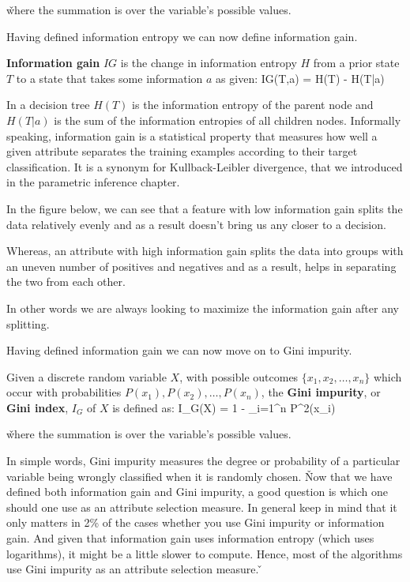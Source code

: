 \v

where the summation is over the variable's possible values.
\ed

Having defined information entropy we can now define information gain.

\textbf{Information gain} $IG$ is the change in information entropy $H$ from a prior state $T$ to a state that takes
some information $a$ as given:
\bse
IG(T,a) = H(T) - H(T|a)
\ese
\ed

In a decision tree $H(T)$ is the information entropy of the parent node and $H(T|a)$ is the sum of the information
entropies of all children nodes. Informally speaking, information gain is a statistical property that measures how
well a given attribute separates the training examples according to their target classification. It is a synonym for
Kullback-Leibler divergence, that we introduced in the parametric inference chapter.

\be
In the figure below, we can see that a feature with low information gain splits the data relatively evenly and as a
result doesn't bring us any closer to a decision.


Whereas, an attribute with high information gain splits the data into groups with an uneven number of positives and
negatives and as a result, helps in separating the two from each other.


In other words we are always looking to maximize the information gain after any splitting.
\ee

Having defined information gain we can now move on to Gini impurity.

Given a discrete random variable $X$, with possible outcomes $\{x_{1}, x_{2}, \ldots, x_{n} \}$ which occur with
probabilities $ P(x_{1}), P(x_{2}), \ldots, P(x_{n})$, the \textbf{Gini impurity}, or \textbf{Gini index}, $I_{G}$ of
$X$ is defined as:
\bse
I_{G}(X) = 1 - \sum _{i=1}^{n} P^2(x_{i})
\ese

\v

where the summation is over the variable's possible values.
\ed

In simple words, Gini impurity measures the degree or probability of a particular variable being wrongly classified
when it is randomly chosen.  \v

Now that we have defined both information gain and Gini impurity, a good question is which one should one use as an
attribute selection measure. In general keep in mind that it only matters in 2\% of the cases whether you use Gini
impurity or information gain. And given that information gain uses information entropy (which uses logarithms), it
might be a little slower to compute. Hence, most of the algorithms use Gini impurity as an attribute selection
measure. \v


